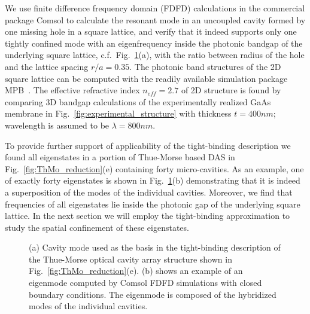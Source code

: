 We use finite difference frequency domain (FDFD) calculations in the commercial package Comsol to calculate the resonant mode in an uncoupled cavity formed by one missing hole in a square lattice, and verify that it indeed supports only one tightly confined mode with an eigenfrequency inside the photonic bandgap of the underlying square lattice, c.f.~Fig.~\ref{fig:comsol_model}(a), with the ratio between radius of the hole and the lattice spacing $r/a=0.35$. The photonic band structures of the 2D square lattice can be computed with the readily available simulation package MPB~\cite{2001_Johnson_Joannopoulos_mpb}. The effective refractive index $n_{eff}=2.7$ of 2D structure is found by comparing 3D bandgap calculations of the experimentally realized GaAs membrane in Fig.~\ref{fig:experimental_structure} with thickness $t=400nm$; wavelength is assumed to be $\lambda=800nm$. 

To provide further support of applicability of the tight-binding description we found all eigenstates in a portion of Thue-Morse based DAS in Fig.~\ref{fig:ThMo_reduction}(e) containing forty micro-cavities. As an example, one of exactly forty eigenstates is shown in Fig.~\ref{fig:comsol_model}(b) demonstrating that it is indeed a superposition of the modes of the individual cavities. Moreover, we find that frequencies of all eigenstates lie inside the photonic gap of the underlying square lattice. In the next section we will employ the tight-binding approximation to study the spatial confinement of these eigenstates.

\begin{figure}%
\vskip -0.15in
\caption[(a) Cavity mode used as the basis in the tight-binding description of the Thue-Morse optical cavity array structure shown in Fig.~\ref{fig:ThMo_reduction}(e).]{\label{fig:comsol_model} (a) Cavity mode used as the basis in the tight-binding description of the Thue-Morse optical cavity array structure shown in Fig.~\ref{fig:ThMo_reduction}(e). (b) shows an example of an eigenmode computed by Comsol FDFD simulations with closed boundary conditions. The eigenmode is composed of the hybridized modes of the individual cavities.}
\end{figure}

